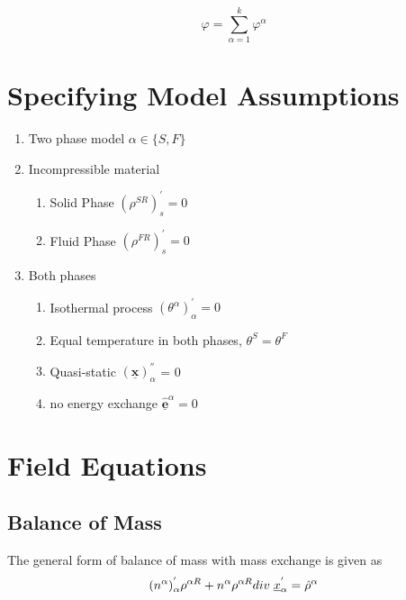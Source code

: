 \documentclass[12pt]{article}
\begin{document}
$$\varphi = \sum_{\alpha=1}^{k}\varphi^\alpha $$



\section{Specifying Model Assumptions}

\begin{enumerate}
	\item Two phase model $\alpha \in \{ S, F \}$
	\item Incompressible material
	\begin{enumerate}
		\item Solid Phase $(\rho^{SR})_{s}^{'} = 0$
		\item Fluid Phase $(\rho^{FR})_{s}^{'} = 0$
	\end{enumerate}
	\item Both phases
	\begin{enumerate}
		\item Isothermal process $(\theta^{\alpha})_{\alpha}^{'} = 0$
		\item Equal temperature in both phases, $\theta^{S}=\theta^{F}$
		\item Quasi-static ${({\underline{\mathbf{x}}})_{\alpha}^{''}}$ = 0
		\item no energy exchange $\mathbf{\hat{\underline{e}}}^{\alpha}=0$
	\end{enumerate}
\end{enumerate}

\section{Field Equations}
\subsection{Balance of Mass}
The general form of balance of mass with mass exchange is given as
\begin{equation*}
	({{{n}}}^{\alpha})_{\alpha}^{'} {\rho^{\alpha R}} + {{n}^{\alpha}}{\rho^{\alpha R}}{{div}\hspace{1mm}{{\underline{{x}}}_{\alpha}^{'}}} = {\hat{\rho}}^{\alpha}
\end{equation*}
\end{document}
